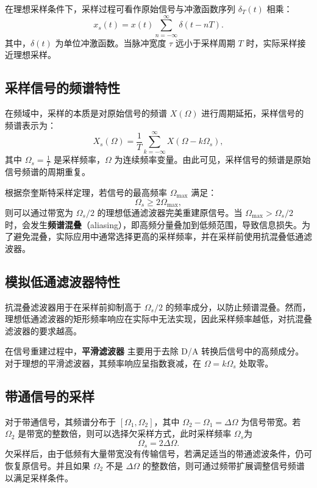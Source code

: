 \documentclass[lang=cn,newtx,10pt,scheme=chinese]{elegantbook}
\begin{document}
在理想采样条件下，采样过程可看作原始信号与冲激函数序列 $\delta_T (t)$ 相乘：
\begin{equation}
    x_s (t) = x(t) \sum_{n=-\infty}^{\infty} \delta (t - nT).
\end{equation}
其中，$\delta (t)$ 为单位冲激函数。当脉冲宽度 $\tau$ 远小于采样周期 $T$ 时，实际采样接近理想采样。

\subsection{采样信号的频谱特性}
在频域中，采样的本质是对原始信号的频谱 $X(\Omega)$ 进行周期延拓，采样信号的频谱表示为：
\begin{equation}
    X_s(\Omega) = \frac{1}{T} \sum_{k=-\infty}^{\infty} X\left(\Omega - k\Omega_s\right),
\end{equation}
其中 $\Omega_s = \frac{1}{T}$ 是采样频率，$\Omega$ 为连续频率变量。由此可见，采样信号的频谱是原始信号频谱的周期重复。

根据奈奎斯特采样定理，若信号的最高频率 $\Omega_{\max}$ 满足：
\begin{equation}
    \Omega_s \geq 2\Omega_{\max},
\end{equation}
则可以通过带宽为 $\Omega_s/2$ 的理想低通滤波器完美重建原信号。当 $\Omega_{\max} > \Omega_s/2$ 时，会发生\textbf{频谱混叠}（aliasing），即高频分量叠加到低频范围，导致信息损失。为了避免混叠，实际应用中通常选择更高的采样频率，并在采样前使用抗混叠低通滤波器。


\subsection{模拟低通滤波器特性}
抗混叠滤波器用于在采样前抑制高于 $\Omega_s/2$ 的频率成分，以防止频谱混叠。然而，理想低通滤波器的矩形频率响应在实际中无法实现，因此采样频率越低，对抗混叠滤波器的要求越高。

在信号重建过程中，\textbf{平滑滤波器} 主要用于去除 D/A 转换后信号中的高频成分。对于理想的平滑滤波器，其频率响应呈指数衰减，在 $\Omega = k\Omega_s$ 处取零。

\subsection{带通信号的采样}
对于带通信号，其频谱分布于 $\left[\Omega_1, \Omega_2\right]$，其中 $\Omega_2 - \Omega_1 = \Delta\Omega$ 为信号带宽。若 $\Omega_2$ 是带宽的整数倍，则可以选择欠采样方式，此时采样频率 $\Omega_s$为
\begin{equation}
    \Omega_s = 2\Delta\Omega.
\end{equation}
欠采样后，由于低频有大量带宽没有传输信号，若满足适当的带通滤波条件，仍可恢复原信号。并且如果 $\Omega_2$ 不是 $\Delta\Omega$ 的整数倍，则可通过频带扩展调整信号频谱以满足采样条件。
\end{document}
